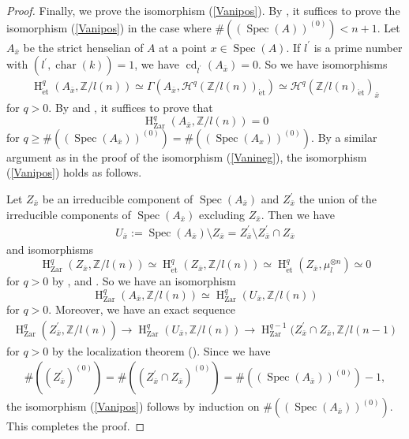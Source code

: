 \documentclass{article}
\newcommand{\spec}{\operatorname{Spec}}
\newcommand{\et}{\mathrm{\acute{e}t}}
\newcommand{\Zar}{\mathrm{Zar}}
\newcommand{\HO}{\operatorname{H}}
\begin{document}
\begin{proof}
Finally, we prove the isomorphism (\ref{Vanipos}). By \cite[Proposition 2.1]{Sak4},
it suffices to prove the isomorphism (\ref{Vanipos}) in the case where 
$\#((\spec(A))^{(0)})<n+1$. Let $A_{\bar{x}}$ be the strict henselian of $A$
at a point $x\in \spec(A)$. If $l^{\prime}$ is a prime number with $(l^{\prime}, \operatorname{char}(k))=1$,
we have $\operatorname{cd}_{l^{\prime}}(A_{\bar{x}})=0$. So we have isomorphisms
%
\begin{align*}
\HO^{q}_{\et}(
A_{\bar{x}},
\mathbb{Z}/l(n)
)  
\simeq
\Gamma\left(
A_{\bar{x}}, 
\mathcal{H}^{q}(
\mathbb{Z}/l(n)
)_{\et}
\right)
\simeq 
\mathcal{H}^{q}\left(
\mathbb{Z}/l(n)_{\et}
\right)_{\bar{x}}
\end{align*}
%
for $q>0$. By \cite[p.774, Theorem 1.2.2]{Ge} and \cite{V2}, 
it suffices to prove that
%
\begin{equation*}
\HO^{q}_{\Zar}(
A_{\bar{x}},
\mathbb{Z}/l(n)
)    
=0
\end{equation*}
%
for 
%
\begin{math}
q\geq 
\#((\spec(A_{\bar{x}}))^{(0)})
=
\#((\spec(A_{x}))^{(0)}).
\end{math}
%
By a similar argument as in the proof of the isomorphism (\ref{Vanineg}), 
the isomorphism (\ref{Vanipos}) holds as follows.

Let $Z_{\bar{x}}$ be an irreducible component of $\spec(A_{\bar{x}})$
and $Z_{\bar{x}}^{\prime}$ the union of the irreducible components of
$\spec(A_{\bar{x}})$ excluding $Z_{\bar{x}}$. Then we have
%
\begin{align*}
U_{\bar{x}}
:=
\spec(A_{\bar{x}})\setminus
Z_{\bar{x}}
=
Z^{\prime}_{\bar{x}}
\setminus
Z^{\prime}_{\bar{x}}
\cap
Z_{\bar{x}}
\end{align*}
%
and isomorphisms
%
\begin{equation*}
\HO^{q}_{\Zar}(
Z_{\bar{x}},
\mathbb{Z}/l(n)
)    
\simeq
\HO^{q}_{\et}(
Z_{\bar{x}},
\mathbb{Z}/l(n)
)    
\simeq
\HO^{q}_{\et}(
Z_{\bar{x}},
\mu_{l}^{\otimes n}
) 
\simeq
0
\end{equation*}
%
for $q>0$ by \cite[p.774, Theorem 1.2.2 and Theorem 1.2.4]{Ge}, \cite{V2}
and \cite[p.786, Corollary 4.4]{Ge}. 
So we have an isomorphism
%
\begin{equation*}
\HO^{q}_{\Zar}(
A_{\bar{x}},
\mathbb{Z}/l(n)
)    
\simeq 
\HO^{q}_{\Zar}(
U_{\bar{x}},
\mathbb{Z}/l(n)
) 
\end{equation*}
%
for $q>0$. Moreover, we have an exact sequence
%
\begin{align*}
\HO^{q}_{\Zar}(
Z^{\prime}_{\bar{x}},
\mathbb{Z}/l(n)
)    
\to
\HO^{q}_{\Zar}(
U_{\bar{x}}, 
\mathbb{Z}/l(n)
)
\to
\HO^{q-1}_{\Zar}(
Z^{\prime}_{\bar{x}}\cap
Z_{\bar{x}},
\mathbb{Z}/l(n-1)
\end{align*}
%
for $q>0$ by the localization theorem (\cite[p.779, Theorem 3.2]{Ge}). Since we have
%
\begin{align*}
\#((Z^{\prime}_{\bar{x}})^{(0)})
=
\#((
Z^{\prime}_{\bar{x}}
\cap
Z_{\bar{x}}
)^{(0)})
=
\#(
(
\spec(A_{\bar{x}})
)^{(0)}
)
-1,
\end{align*}
%
the isomorphism (\ref{Vanipos}) follows by induction on
$\#((\spec(A_{\bar{x}}))^{(0)})$. This completes the proof.
\end{proof}
%
\end{document}
